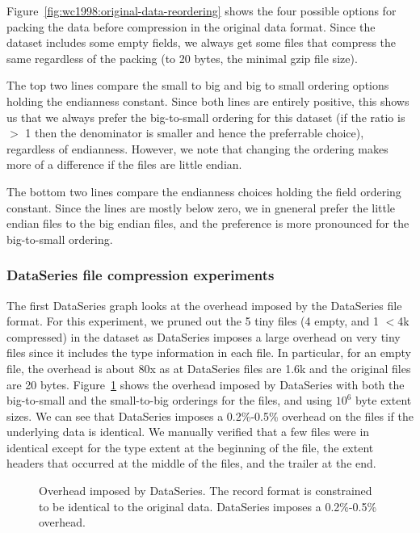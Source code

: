 Figure~\ref{fig:wc1998:original-data-reordering} shows the four
possible options for packing the data before compression in the
original data format.  Since the dataset includes some empty fields,
we always get some files that compress the same regardless of the
packing (to 20 bytes, the minimal gzip file size).

The top two lines compare the small to big and big to small ordering
options holding the endianness constant.  Since both lines are
entirely positive, this shows us that we always prefer the
big-to-small ordering for this dataset (if the ratio is $>$ 1 then the
denominator is smaller and hence the preferrable choice), regardless
of endianness.  However, we note that changing the ordering makes more
of a difference if the files are little endian.

The bottom two lines compare the endianness choices holding the field
ordering constant.  Since the lines are mostly below zero, we in
gneneral prefer the little endian files to the big endian files, and
the preference is more pronounced for the big-to-small ordering.

\subsubsection{DataSeries file compression experiments}

The first DataSeries graph looks at the overhead imposed by the
DataSeries file format.  For this experiment, we pruned out the 5 tiny
files (4 empty, and 1 $<$4k compressed) in the dataset as DataSeries
imposes a large overhead on very tiny files since it includes the type
information in each file.  In particular, for an empty file, the
overhead is about 80x as at DataSeries files are 1.6k and the original
files are 20 bytes.  Figure~\ref{fig:wc1998:ds-overhead} shows
the overhead imposed by DataSeries with both the big-to-small and the
small-to-big orderings for the files, and using $10^6$ byte extent
sizes.  We can see that DataSeries imposes a 0.2\%-0.5\% overhead on
the files if the underlying data is identical.  We manually verified
that a few files were in identical except for the type extent at the
beginning of the file, the extent headers that occurred at the middle
of the files, and the trailer at the end.

\begin{figure}
\caption{Overhead imposed by DataSeries. The record format is constrained
to be identical to the original data.  DataSeries imposes a
0.2\%-0.5\% overhead.}
\label{fig:wc1998:ds-overhead}
\end{figure}

